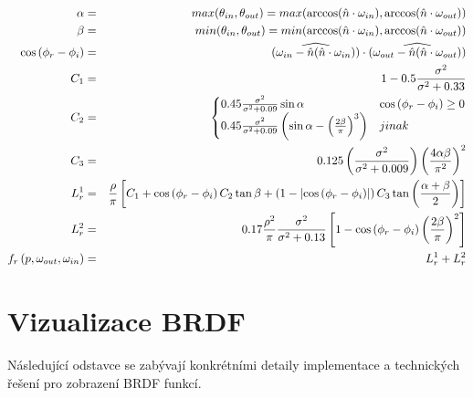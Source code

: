 \documentclass[czech,master,dept460,male,cpp,cpdeclaration]{diploma}
\newcommand{\uvec}[1]{\hat{#1}}
\newcommand{\rough}{\sigma}
\newcommand{\alb}{\rho}
\begin{document}
\begin{eqnarray}
    \alpha & = & max(\theta_{in}, \theta_{out}) = max(\arccos(\uvec{n}\cdot\omega_{in}), \arccos(\uvec{n}\cdot\omega_{out})) \nonumber \\
    \beta & = & min(\theta_{in}, \theta_{out}) = min(\arccos(\uvec{n}\cdot\omega_{in}), \arccos(\uvec{n}\cdot\omega_{out})) \nonumber \\
    \cosphiri & = & \widehat{\left( \omega_{in} - \uvec{n}(\uvec{n}\cdot\omega_{in}) \right)} \cdot \widehat{\left( \omega_{out} - \uvec{n}(\uvec{n}\cdot\omega_{out})  \right)} \nonumber \\
    C_1 & = & 1-0.5\frac{\rough^2}{\rough^2 + 0.33} \nonumber \\
    C_2 & = & \left\{\begin{matrix*}[l] 0.45\frac{\rough^2}{\rough^2+0.09}\sin\alpha & \cosphiri \geq 0\\ 0.45\frac{\rough^2}{\rough^2+0.09}\left(\sin\alpha-\left(\frac{2\beta}{\pi}\right)^3\right) & jinak \end{matrix*}\right. \nonumber \\
    C_3 & = & 0.125\left(\frac{\rough^2}{\rough^2 + 0.009}\right)\left(\frac{4\alpha\beta}{\pi^2}\right)^2 \nonumber \\
    L^{1}_{r} & = & \frac{\alb}{\pi}\left[C_1 + \cosphiri C_2\tan\beta + \left( 1-\left | \cosphiri  \right | \right)C_3\tan \left(\frac{\alpha+\beta}{2}\right)\right] \nonumber \\
    L^{2}_{r} & = & 0.17\frac{\alb^2}{\pi}\frac{\rough^2}{\rough^2+0.13}\left[1 - \cosphiri  \left(\frac{2\beta}{\pi}\right)^2 \right] \nonumber \\
    f_r\left(p,\omega_{out},\omega_{in}\right) & = & L^{1}_{r} + L^{2}_{r} \label{eq:OrenNayar}
\end{eqnarray}

\clearpage
\section{Vizualizace BRDF}
Následující odstavce se zabývají konkrétními detaily implementace a technických řešení pro zobrazení BRDF funkcí.
\end{document}
